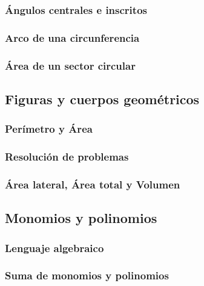 \documentclass[12pt,addpoints]{evalua3}
\begin{document}
\begin{questions}
	\subsubsection{Ángulos centrales e inscritos}
	\question{}
	\subsubsection{Arco de una circunferencia}
	\question{}
	\subsubsection{Área de un sector circular}
	\question{}
	\subsection   {Figuras y cuerpos geométricos}
	\subsubsection{Perímetro y Área}
	\question{}
	\subsubsection{Resolución de problemas}
	\question{}
	\subsubsection{Área lateral, Área total y Volumen}
	\question{}
	\subsection   {Monomios y polinomios}
	\subsubsection{Lenguaje algebraico}
	\question{}
	\subsubsection{Suma de monomios y polinomios}
	\question{}

\end{questions}
\end{document}
